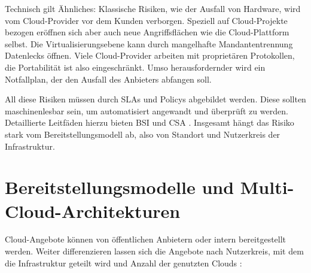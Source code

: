 Technisch gilt Ähnliches: Klassische Risiken, wie der Ausfall von Hardware, wird vom Cloud-Provider vor dem Kunden verborgen. Speziell auf Cloud-Projekte bezogen eröffnen sich aber auch neue Angriffsflächen wie die Cloud-Plattform selbst. Die Virtualisierungsebene kann durch mangelhafte Mandantentrennung Datenlecks öffnen. Viele Cloud-Provider arbeiten mit proprietären Protokollen, die Portabilität ist also eingeschränkt. Umso herausfordernder wird ein Notfallplan, der den Ausfall des Anbieters abfangen soll.

All diese Risiken müssen durch SLAs und Policys abgebildet werden. Diese sollten maschinenlesbar sein, um automatisiert angewandt und überprüft zu werden. Detaillierte Leitfäden hierzu bieten BSI und CSA \cite{bsi:2014:Sicherheitsrichtlinie, csa:2015:star}. Insgesamt hängt das Risiko stark vom Bereitstellungsmodell ab, also von Standort und Nutzerkreis der Infrastruktur.

\section{Bereitstellungsmodelle und Multi-Cloud-Architekturen}


Cloud-Angebote können von öffentlichen Anbietern oder intern bereitgestellt werden. Weiter differenzieren lassen sich die Angebote nach Nutzerkreis, mit dem die Infrastruktur geteilt wird und Anzahl der genutzten Clouds \cite{petcu:2014:cloud-taxonomy, grozev:2014:cloud-taxonomy}:

